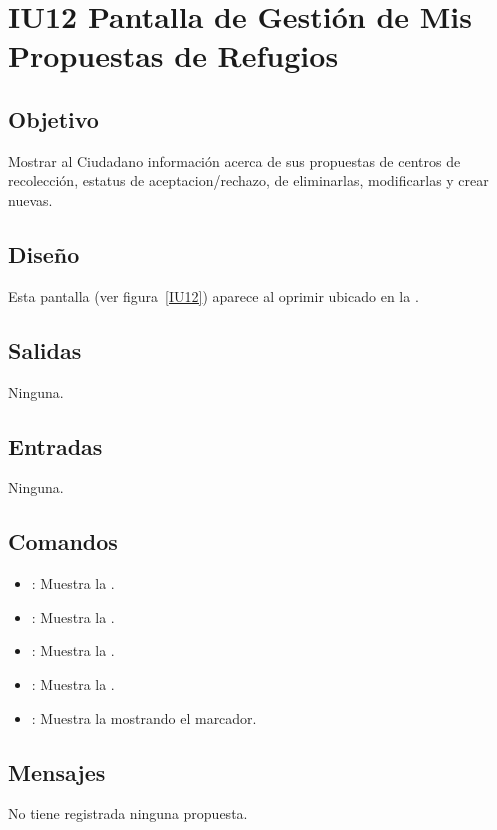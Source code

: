 \section{IU12 Pantalla de Gestión de Mis Propuestas de Refugios}

\subsection{Objetivo}
	Mostrar al Ciudadano información acerca de sus propuestas de centros de recolección, estatus de aceptacion/rechazo, de eliminarlas, modificarlas y crear nuevas.

\subsection{Diseño}
	Esta pantalla  (ver figura~\ref{IU12}) aparece al oprimir  ubicado en la .
	

\subsection{Salidas}

	Ninguna.

\subsection{Entradas}
	Ninguna.

\subsection{Comandos}
\begin{itemize}
	\item {}: Muestra la .
	\item {}: Muestra la .
	\item {}: Muestra la . 
	\item {}: Muestra la .
	\item {}: Muestra la  mostrando el marcador.
\end{itemize}

\subsection{Mensajes}

\begin{Citemize}
	\item No tiene registrada ninguna propuesta.
\end{Citemize}

\clearpage
